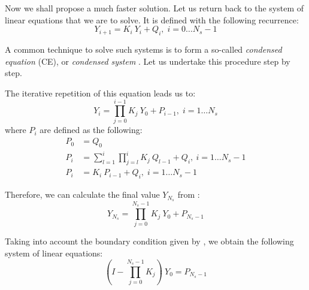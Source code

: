 Now we shall propose a much faster solution. Let us return back to the system of linear equations that we are to solve. It is defined with the following recurrence:
\begin{equation} \label{eq:ce-recurrent}
  Y_{i + 1} = K_i \: Y_i + Q_i, \; i = 0 \dots N_s - 1
\end{equation}

A common technique to solve such systems is to form a so-called \emph{condensed equation} (CE), or \emph{condensed system} \cite{stoer2002}. Let us undertake this procedure step by step.

The iterative repetition of this equation leads us to:
\begin{equation} \label{eq:y-recurrent}
  Y_i = \prod_{j = 0}^{i - 1} K_j \: Y_0 + P_{i - 1}, \; i = 1 \dots N_s
\end{equation}
where $P_i$ are defined as the following:
\begin{align}
  P_0 & = Q_0 \nonumber \\
  P_i & = \sum_{l = 1}^i \prod_{j = l}^i K_j \: Q_{l - 1} + Q_i, \: i = 1 \dots N_s - 1 \nonumber \\
  P_i & = K_i \: P_{i - 1} + Q_i, \; i = 1 \dots N_s - 1 \label{eq:p-recurrent}
\end{align}

Therefore, we can calculate the final value $Y_{N_s}$ from :
\[
  Y_{N_s} = \prod_{j = 0}^{N_s - 1} K_j \: Y_0 + P_{N_s - 1}
\]

Taking into account the boundary condition given by , we obtain the following system of linear equations:
\begin{equation} \label{eq:core-system}
  (I - \prod_{j = 0}^{N_s - 1} K_j) \: Y_0 = P_{N_s - 1}
\end{equation}

